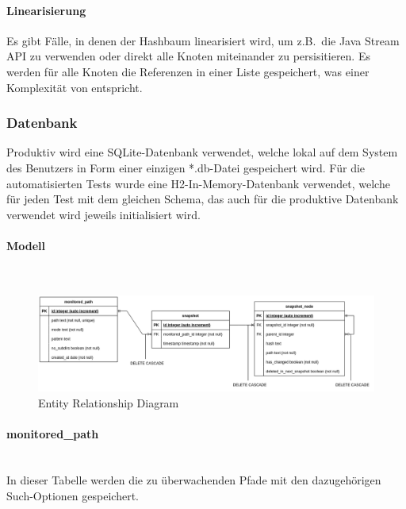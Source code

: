 \documentclass[a4paper,12pt]{report}
\begin{document}
    \paragraph*{Linearisierung}

    Es gibt Fälle, in denen der Hashbaum linearisiert wird, um z.B.\ die Java Stream API zu verwenden oder direkt alle Knoten miteinander zu persisitieren.
    Es werden für alle Knoten die Referenzen in einer Liste gespeichert, was einer Komplexität von   entspricht.

    \clearpage

    \subsubsection{Datenbank}\label{subsubsec:realisierung-datenbank}
    Produktiv wird eine SQLite-Datenbank verwendet, welche lokal auf dem System des Benutzers in Form einer einzigen *.db-Datei gespeichert wird.
    Für die automatisierten Tests wurde eine H2-In-Memory-Datenbank verwendet, welche für jeden Test mit dem gleichen Schema,
    das auch für die produktive Datenbank verwendet wird jeweils initialisiert wird.

    \paragraph*{Modell}\mbox{}\\
    \begin{figure}[h]
        \centering
        \includegraphics[width=1\textwidth]{assets/erd}
        \caption{Entity Relationship Diagram}
    \end{figure}

    \paragraph*{monitored\_path}\mbox{}\\
    In dieser Tabelle werden die zu überwachenden Pfade mit den dazugehörigen Such-Optionen gespeichert.
\end{document}
